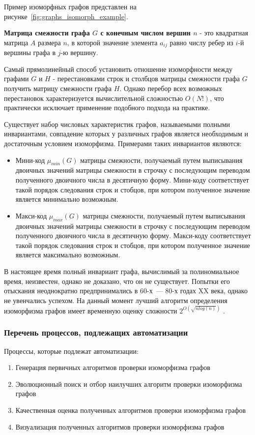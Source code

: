 \documentclass[russian,utf8,emptystyle]{eskdtext}
\begin{document}
Пример изоморфных графов представлен на рисунке~\ref{fig:graphs_isomorph_example}.

\textbf{Матрица смежности графа $G$ с конечным числом вершин $n$} - это квадратная матрица $A$ размера $n$, в которой значение элемента $a_{ij}$ равно числу ребер из $i$-й вершины графа в $j$-ю вершину. 

Самый прямолинейный способ установить отношение изоморфности между графами $G$ и $H$ - перестановками строк и столбцов матрицы смежности графа $G$ получить матрицу смежности графа $H$. Однако перебор всех возможных перестановок характеризуется вычислительной сложностью $O(N!)$, что практически исключает применение подобного подхода на практике.

Существует набор числовых характеристик графов, называемыми полными инвариантами, совпадение которых у различных графов является необходимым и достаточным условием изоморфизма. Примерами таких инвариантов являются:
\begin{itemize}
\item Мини-код $\mu_{min}(G)$ матрицы смежности, получаемый путем выписывания двоичных значений матрицы смежности в строчку с последующим переводом полученного двоичного числа в десятичную форму. Мини-коду соответствует такой порядок следования строк и стобцов, при котором полученное значение является минимально возможным.
\item Макси-код $\mu_{max}(G)$ матрицы смежности, получаемый путем выписывания двоичных значений матрицы смежности в строчку с последующим переводом полученного двоичного числа в десятичную форму. Макси-коду соответствует такой порядок следования строк и стобцов, при котором полученное значение является максимально возможным.
\end{itemize}

В настоящее время полный инвариант графа, вычислимый за полиномиальное время, неизвестен, однако не доказано, что он не существует. Попытки его отыскания неоднократно предпринимались в 60-х~--- 80-х годах XX века, однако не увенчались успехом. На данный момент лучший алгоритм определения изоморфизма графов имеет временную оценку сложности $2^{O(\sqrt{n log(n)})}$ \cite{Johnson2005} \cite{BabaiCodenotti2008}.

\subsubsection{Перечень процессов, подлежащих автоматизации}
Процессы, которые подлежат автоматизации:
\begin{enumerate}
\item Генерация первичных алгоритмов проверки изоморфизма графов
\item Эволюционный поиск и отбор наилучших алгоритм проверки изоморфизма графов
\item Качественная оценка полученных алгоритмов проверки изоморфизма графов
\item Визуализация полученных алгоритмов проверки изоморфизма графов
\end{enumerate}
\end{document}
